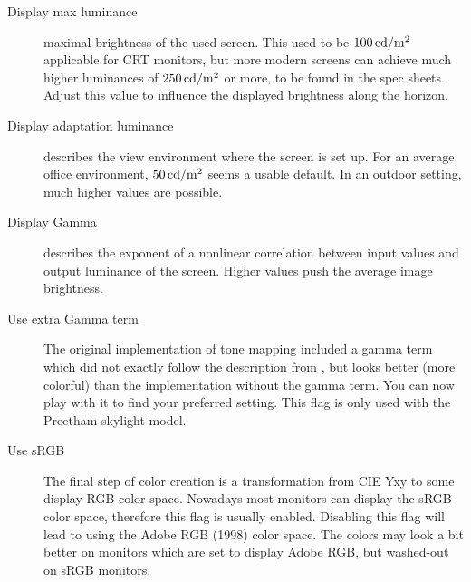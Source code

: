 \begin{description}
\item[Display max luminance] maximal brightness of the used
  screen. This used to be $100 \,\mathrm{cd}/\mathrm{m}^2$ applicable for CRT monitors,
  but more modern screens can achieve much higher luminances of $250
  \,\mathrm{cd}/\mathrm{m}^2$ or more, to be found in the spec sheets. Adjust this value
  to influence the displayed brightness along the horizon.
\item[Display adaptation luminance] describes the view environment
  where the screen is set up. For an average office environment,
  $50 \,\mathrm{cd}/\mathrm{m}^2$ seems a usable default. In an outdoor setting, much
  higher values are possible.
\item[Display Gamma] describes the exponent of a nonlinear correlation
  between input values and output luminance of the screen. Higher
  values push the average image brightness.
\item[Use extra Gamma term] The original implementation of tone
  mapping included a gamma term which did not exactly follow the
  description from \citet{Larson:1997}, but looks better (more
  colorful) than the implementation without the gamma term. You can
  now play with it to find your preferred setting. This flag is only
  used with the Preetham skylight model.
\item[Use sRGB] The final step of color creation is a transformation
  from CIE Yxy to some display RGB color space. Nowadays most monitors
  can display the sRGB color space, therefore this flag is usually
  enabled. Disabling this flag will lead to using the Adobe RGB
  (1998) color space. The colors may look a bit better on monitors
  which are set to display Adobe RGB, but washed-out on sRGB monitors.
\end{description}



